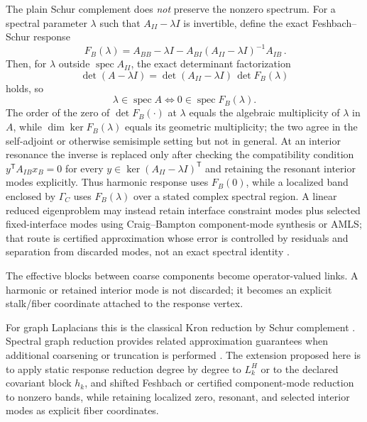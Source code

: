 \documentclass[11pt,letterpaper]{article}
\begin{document}
The plain Schur complement does \emph{not} preserve the nonzero spectrum. For a
spectral parameter $\lambda$ such that $A_{II}-\lambda I$ is invertible, define
the exact Feshbach--Schur response
\begin{equation*}
  \boxed{\,F_{B}(\lambda)=A_{BB}-\lambda I
    - A_{BI}(A_{II}-\lambda I)^{-1}A_{IB}\,}.
\end{equation*}
Then, for $\lambda$ outside $\operatorname{spec}A_{II}$, the exact determinant
factorization
\begin{equation*}
  \det(A-\lambda I)=\det(A_{II}-\lambda I)\,\det F_{B}(\lambda)
\end{equation*}
holds, so
\begin{equation*}
  \lambda\in\operatorname{spec}A \iff 0\in\operatorname{spec}F_{B}(\lambda).
\end{equation*}
The order of the zero of $\det F_{B}(\cdot)$ at $\lambda$ equals the algebraic
multiplicity of $\lambda$ in $A$, while $\dim\ker F_{B}(\lambda)$ equals its
geometric multiplicity; the two agree in the self-adjoint or otherwise
semisimple setting but not in general. At an interior resonance the inverse is
replaced only after checking the compatibility condition
$y^{\mathsf T}A_{IB}x_B=0$ for every
$y\in\ker(A_{II}-\lambda I)^{\mathsf T}$ and retaining the resonant
interior modes explicitly. Thus harmonic response uses $F_{B}(0)$, while a
localized band enclosed by $\Gamma_C$ uses $F_B(\lambda)$ over a stated
complex spectral region. A linear reduced eigenproblem may instead retain interface
constraint modes plus selected fixed-interface modes using Craig--Bampton
component-mode synthesis or AMLS; that route is certified approximation whose
error is controlled by residuals and separation from discarded modes, not an
exact spectral identity \cite{craigbampton1968,bennighoflehoucq2004,bcfs2003}.

The effective blocks between coarse components become operator-valued links. A
harmonic or retained interior mode is not discarded; it becomes an explicit
stalk/fiber coordinate attached to the response vertex.

For graph Laplacians this is the classical Kron reduction by Schur complement
\cite{dorflerbullo2013}. Spectral graph reduction provides related
approximation guarantees when additional coarsening or truncation is performed
\cite{loukas2019}. The extension proposed here is to apply static response
reduction degree by degree to $L_k^H$ or to the declared covariant block
$h_k$, and shifted Feshbach or certified component-mode reduction to nonzero
bands, while retaining localized zero, resonant, and selected interior modes
as explicit fiber coordinates.
\end{document}
